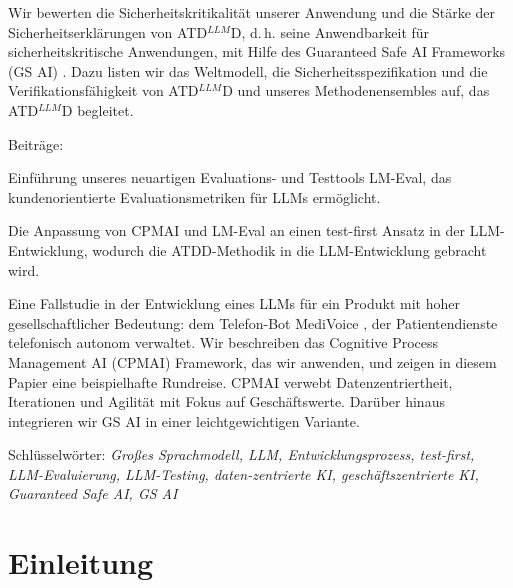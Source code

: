 \documentclass[twocolumn]{article}
\newcommand{\ATDLLMD}{ATD$^{LLM}$D}%
\begin{document}
Wir bewerten die Sicherheitskritikalität unserer Anwendung und die Stärke der Sicherheitserklärungen von \ATDLLMD{}, d.\,h. seine Anwendbarkeit für sicherheitskritische Anwendungen, mit Hilfe des Guaranteed Safe AI Frameworks (GS AI) \cite{Dalrymple24}. Dazu listen wir das Weltmodell, die Sicherheitsspezifikation und die Verifikationsfähigkeit von \ATDLLMD{} und unseres Methodenensembles auf, das \ATDLLMD{} begleitet.

Beiträge:
\begin{compactitem}
\item Einführung unseres neuartigen Evaluations- und Testtools LM-Eval, das kundenorientierte Evaluationsmetriken für LLMs ermöglicht.
\item Die Anpassung von CPMAI und LM-Eval an einen test-first Ansatz in der LLM-Entwicklung, wodurch die ATDD-Methodik in die LLM-Entwicklung gebracht wird.
\item Eine Fallstudie in der Entwicklung eines LLMs für ein Produkt mit hoher gesellschaftlicher Bedeutung: dem Telefon-Bot MediVoice \cite{MediVoice}, der Patientendienste telefonisch autonom verwaltet. Wir beschreiben das Cognitive Process Management AI (CPMAI) Framework, das wir anwenden, und zeigen in diesem Papier eine beispielhafte Rundreise. CPMAI verwebt Datenzentriertheit, Iterationen und Agilität mit Fokus auf Geschäftswerte. Darüber hinaus integrieren wir GS AI in einer leichtgewichtigen Variante.
\end{compactitem}

Schlüsselwörter: \emph{Großes Sprachmodell, LLM, Entwicklungsprozess, test-first, LLM-Evaluierung, LLM-Testing, daten-zentrierte KI, geschäftszentrierte KI, Guaranteed Safe AI, GS AI}

\section{Einleitung}
\end{document}
